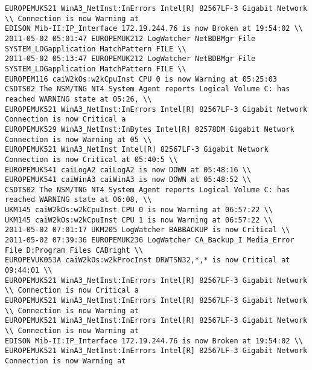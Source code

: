 \begin{lstlisting}
EUROPEMUK521 WinA3_NetInst:InErrors Intel[R] 82567LF-3 Gigabit Network \\ Connection is now Warning at
EDISON Mib-II:IP_Interface 172.19.244.76 is now Broken at 19:54:02 \\
2011-05-02 05:01:47 EUROPEMUK212 LogWatcher NetBDBMgr File SYSTEM_LOGapplication MatchPattern FILE \\
2011-05-02 05:13:47 EUROPEMUK212 LogWatcher NetBDBMgr File SYSTEM_LOGapplication MatchPattern FILE \\
EUROPEM116 caiW2kOs:w2kCpuInst CPU 0 is now Warning at 05:25:03
CSDTS02 The NSM/TNG NT4 System Agent reports Logical Volume C: has reached WARNING state at 05:26, \\
EUROPEMUK521 WinA3_NetInst:InErrors Intel[R] 82567LF-3 Gigabit Network Connection is now Critical a
EUROPEMUK529 WinA3_NetInst:InBytes Intel[R] 82578DM Gigabit Network Connection is now Warning at 05 \\
EUROPEMUK521 WinA3_NetInst Intel[R] 82567LF-3 Gigabit Network Connection is now Critical at 05:40:5 \\
EUROPEMUK541 caiLogA2 caiLogA2 is now DOWN at 05:48:16 \\
EUROPEMUK541 caiWinA3 caiWinA3 is now DOWN at 05:48:52 \\
CSDTS02 The NSM/TNG NT4 System Agent reports Logical Volume C: has reached WARNING state at 06:08, \\
UKM145 caiW2kOs:w2kCpuInst CPU 0 is now Warning at 06:57:22 \\
UKM145 caiW2kOs:w2kCpuInst CPU 1 is now Warning at 06:57:22 \\
2011-05-02 07:01:17 UKM205 LogWatcher BABBACKUP is now Critical \\
2011-05-02 07:39:36 EUROPEMUK236 LogWatcher CA_Backup_I Media_Error File D:Program Files CABright \\
EUROPEVUK053A caiW2kOs:w2kProcInst DRWTSN32,*,* is now Critical at 09:44:01 \\
EUROPEMUK521 WinA3_NetInst:InErrors Intel[R] 82567LF-3 Gigabit Network \\ Connection is now Critical a
EUROPEMUK521 WinA3_NetInst:InErrors Intel[R] 82567LF-3 Gigabit Network \\ Connection is now Warning at
EUROPEMUK521 WinA3_NetInst:InErrors Intel[R] 82567LF-3 Gigabit Network \\ Connection is now Warning at
EDISON Mib-II:IP_Interface 172.19.244.76 is now Broken at 19:54:02 \\
EUROPEMUK521 WinA3_NetInst:InErrors Intel[R] 82567LF-3 Gigabit Network Connection is now Warning at

\end{lstlisting}
